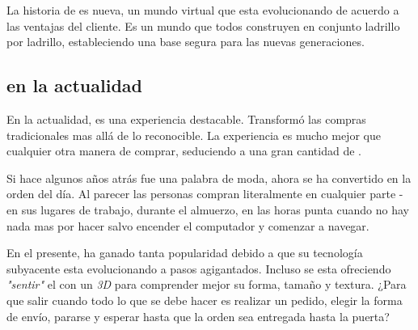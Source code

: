 %
%
%

La historia de \ecommerce es nueva, un mundo virtual que esta evolucionando de acuerdo a las ventajas del cliente. Es un mundo que todos construyen en conjunto ladrillo por ladrillo, estableciendo una base segura para las nuevas generaciones.

\subsection{\ecommerce en la actualidad}

En la actualidad, \ecommerce es una experiencia destacable. Transformó las compras tradicionales mas allá de lo reconocible. La experiencia es mucho mejor que cualquier otra manera de comprar, seduciendo a una gran cantidad de \ecommerce \lovers.

Si hace algunos años atrás \ecommerce fue una palabra de moda, ahora se ha convertido en la orden del día. Al parecer las personas compran literalmente en cualquier parte - en sus lugares de trabajo, durante el almuerzo, en las horas punta cuando no hay nada mas por hacer salvo encender el computador y comenzar a navegar.

En el presente, \ecommerce ha ganado tanta popularidad debido a que su tecnología subyacente esta evolucionando a pasos agigantados. Incluso se esta ofreciendo \textit{"sentir"} el \itemCOM con un \mouse \textit{3D} para comprender mejor su forma, tamaño y textura. ¿Para que salir cuando todo lo que se debe hacer es realizar un pedido, elegir la forma de envío, pararse y esperar hasta que la orden sea entregada hasta la puerta?

